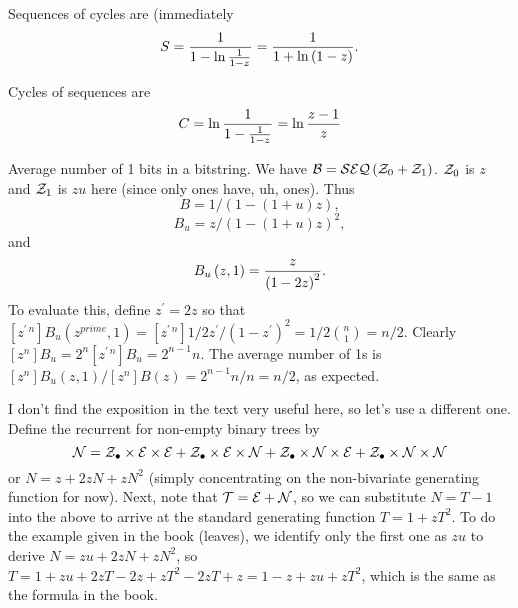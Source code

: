  Sequences of cycles are (immediately
$$
  S = {1 \over {1 - \ln {1 \over 1 - z}}} = {1 \over 1 + \ln \left(1 - z\right)}.
$$

\vskip 0.08in  Cycles of sequences are
$$
 C = \ln {1 \over {1 - {1 \over 1 - z}}} = \ln {z - 1 \over z}
$$

 Average number of 1 bits in a bitstring.\hfil\break
We have ${\cal B} = {\cal SEQ}\left({\cal Z}_0 + {\cal Z}_1\right)$.  ${\cal Z}_0$
is $z$ and ${\cal Z}_1$ is $zu$ here (since only ones have, uh, ones).
Thus 
$$
 B = 1 / \left(1 - \left(1 + u\right) z\right),
$$
$$
B_u = z / \left(1 - \left(1 + u\right) z\right)^2 ,
$$ 
and
$$
 B_u\left(z, 1\right) = {z \over \left(1 - 2 z\right)^2} .
$$
To evaluate this, define $z^{\prime} = 2 z$ so that $\left[z^{\prime\,n}\right] B_u\left(z^{prime},1\right) =
\left[z^{\prime\, n}\right] 1/2 z^{\prime} / \left(1 - z^{\prime}\right)^2 = 1 / 2 {n \choose 1} = n / 2$.
Clearly $\left[z^n\right] B_u = 2^n \left[z^{\prime\,n}\right] B_u = 2^{n-1} n$.  The
average number of 1s is $\left[z^n\right] B_u\left(z, 1\right) / \left[z^n\right] B\left(z\right) =
2^{n-1} n / n = n / 2$, as expected.

 I don't find the exposition in the
text very useful here, so let's use a different one.  Define the recurrent for
non-empty binary trees by
$$
 {\cal N} = {\cal Z}_{\bullet} \times {\cal E} \times {\cal E}
 + {\cal Z}_{\bullet} \times {\cal E} \times {\cal N}
 + {\cal Z}_{\bullet} \times {\cal N} \times {\cal E}
 + {\cal Z}_{\bullet} \times {\cal N} \times {\cal N}
$$
or $N = z + 2 z N + z N^2$ (simply concentrating on the non-bivariate
generating function for now).  Next, note that ${\cal T} = {\cal E} + {\cal N}$,
so we can substitute $N = T - 1$ into the above to arrive at the standard
generating function $T = 1 + z T^2$.  To do the example given in the book
(leaves), we identify only the first one as $z u$ to derive
$N = z u + 2 z N + z N^2$, so $T = 1 + zu + 2 z T - 2z + z T^2 - 2 z T + z =
1 - z + z u + z T^2$, which is the same as the formula in the book.

